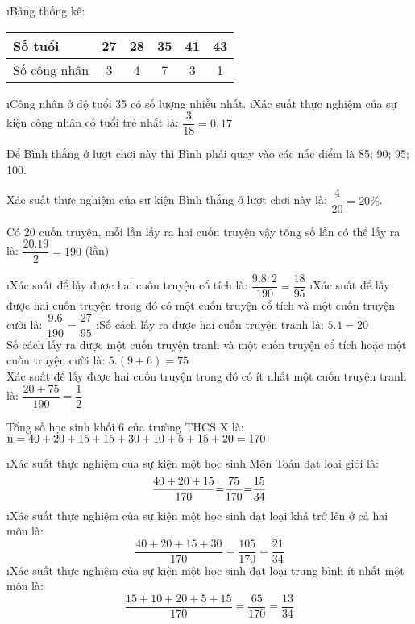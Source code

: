 \begin{Answer}{14}
		\begin{enumerate}[a),leftmargin=*]
			\i Bảng thống kê:
			\begin{center}
				\begin{tabular}{|l|c|c|c|c|c|}
					\hline
					Số tuổi & 27&28&35&41&43\\
					\hline	
					Số công nhân & 3&4&7&3&1\\
					\hline	
				\end{tabular}
			\end{center}
			\i	Công nhân ở độ tuổi  35 có số lượng nhiều nhất.
			\i	Xác suất thực nghiệm của sự kiện công nhân có tuổi trẻ nhất là: $\dfrac{3}{18} = 0,17$
		\end{enumerate}
	
\end{Answer}
\begin{Answer}{15}
		Để Bình thắng ở lượt chơi này thì Bình phải quay vào các nấc điểm là  85;  90; 95; 100.
		
		Xác suất thực nghiệm của sự kiện Bình thắng ở lượt chơi này là:  $\dfrac{4}{{20}} = 20\% $.
	
\end{Answer}
\begin{Answer}{16}
		Có 20 cuốn truyện, mỗi lần lấy ra hai cuốn truyện vậy tổng số lần có thể lấy ra là:  $\dfrac{20.19}{2}= 190$ (lần)
		\begin{enumerate}[a),leftmargin=*]
			\i Xác suất để lấy được hai cuốn truyện cổ tích là: $\dfrac{{9.8:2}}{{190}} = \dfrac{{18}}{{95}}$
			\i Xác suất để lấy được hai cuốn truyện trong đó có một cuốn truyện cổ tích và một cuốn truyện cười là:  $\dfrac{{9.6}}{{190}} = \dfrac{{27}}{{95}}$
			\i Số cách lấy ra được hai cuốn truyện tranh là:  $5.4 = 20$\\
			Số cách lấy ra được một cuốn truyện tranh và một cuốn truyện cổ tích hoặc một cuốn truyện cười là:  $5.\left( {9 + 6} \right) = 75$\\
			Xác suất để lấy được hai cuốn truyện trong đó có ít nhất một cuốn truyện tranh là:  $\dfrac{{20 + 75}}{{190}} = \dfrac{1}{2}$
		\end{enumerate}
	
\end{Answer}
\begin{Answer}{17}
		Tổng số học sinh khối 6 của trường THCS X là:  ${\rm{n  =  40  +  20  + 15  + 15  +  30  +  10  +  5  +  15  +  20  =  170}}$
		\begin{enumerate}[a),leftmargin=*]
			\i Xác suất thực nghiệm của sự kiện một học sinh Môn Toán đạt lọai giỏi là:
			\[\dfrac{{{\rm{40 + 20 + 15}}}}{{{\rm{170}}}}{\rm{ = }}\dfrac{{{\rm{75}}}}{{{\rm{170}}}}{\rm{ = }}\dfrac{{{\rm{15}}}}{{{\rm{34}}}}\]
			\i Xác suất thực nghiệm cůa sự kiện một học sinh đạt loại khá trở lên ở cả hai môn là:
			\[\dfrac{{40 + 20 + 15 + 30}}{{170}} = \dfrac{{105}}{{170}} = \dfrac{{21}}{{34}}\]
			\i Xác suất thực nghiệm cůa sự kiện một học sinh đạt loại trung bình ít nhất một môn là:
			\[\dfrac{{15 + 10 + 20 + 5 + 15}}{{170}} = \dfrac{{65}}{{170}} = \dfrac{{13}}{{34}}\]
		\end{enumerate}
	
\end{Answer}
